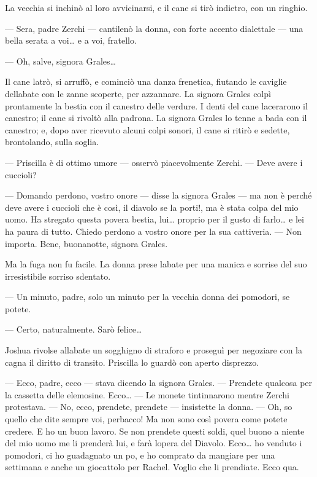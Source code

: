 La vecchia si inchinò al loro avvicinarsi, e il cane si tirò indietro,
con un ringhio.

--- \textquotesingle Sera, padre Zerchi --- cantilenò la donna, con
forte accento dialettale --- una bella serata a voi\ldots{} e a voi,
fratello.

--- Oh, salve, signora Grales\ldots{}

Il cane latrò, si arruffò, e cominciò una danza frenetica, fiutando le
caviglie dell\textquotesingle abate con le zanne scoperte, per
azzannare. La signora Grales colpì prontamente la bestia con il canestro
delle verdure. I denti del cane lacerarono il canestro; il cane si
rivoltò alla padrona. La signora Grales lo tenne a bada con il canestro;
e, dopo aver ricevuto alcuni colpi sonori, il cane si ritirò e sedette,
brontolando, sulla soglia.

--- Priscilla è di ottimo umore --- osservò piacevolmente Zerchi. ---
Deve avere i cuccioli?

--- Domando perdono, vostro onore --- disse la signora Grales --- ma non
è perché deve avere i cuccioli che è così, il diavolo se la porti!, ma è
stata colpa del mio uomo. Ha stregato questa povera bestia, lui\ldots{}
proprio per il gusto di farlo\ldots{} e lei ha paura di tutto. Chiedo
perdono a vostro onore per la sua cattiveria. --- Non importa. Bene,
buonanotte, signora Grales.

Ma la fuga non fu facile. La donna prese l\textquotesingle abate per una
manica e sorrise del suo irresistibile sorriso sdentato.

--- Un minuto, padre, solo un minuto per la vecchia donna dei pomodori,
se potete.

--- Certo, naturalmente. Sarò felice\ldots{}

Joshua rivolse all\textquotesingle abate un sogghigno di straforo e
proseguì per negoziare con la cagna il diritto di transito. Priscilla lo
guardò con aperto disprezzo.

--- Ecco, padre, ecco --- stava dicendo la signora Grales. --- Prendete
qualcosa per la cassetta delle elemosine. Ecco\ldots{} --- Le monete
tintinnarono mentre Zerchi protestava. --- No, ecco, prendete, prendete
--- insistette la donna. --- Oh, so quello che dite sempre voi,
perbacco! Ma non sono così povera come potete credere. E ho un buon
lavoro. Se non prendete questi soldi, quel buono a niente del mio uomo
me li prenderà lui, e farà l\textquotesingle opera del Diavolo.
Ecco\ldots{} ho venduto i pomodori, ci ho guadagnato un
po\textquotesingle, e ho comprato da mangiare per una settimana e anche
un giocattolo per Rachel. Voglio che li prendiate. Ecco qua.

